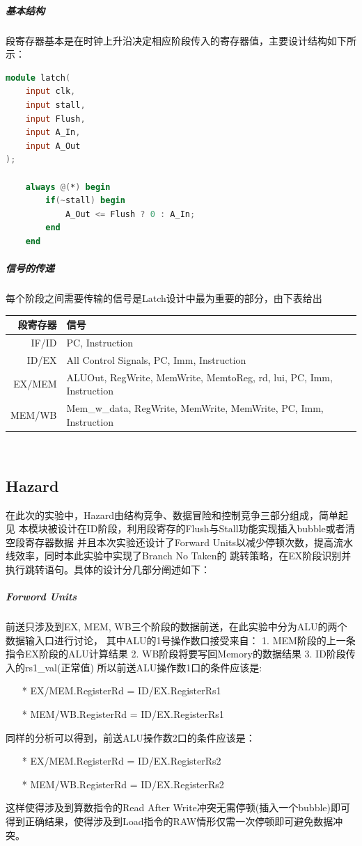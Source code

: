 \subparagraph{基本结构} 
段寄存器基本是在时钟上升沿决定相应阶段传入的寄存器值，主要设计结构如下所示：

\begin{lstlisting}[language = {verilog}]
module latch(
    input clk,
    input stall,
    input Flush,
    input A_In,
    input A_Out
);    

    always @(*) begin
        if(~stall) begin
            A_Out <= Flush ? 0 : A_In;
        end
    end
\end{lstlisting}

\subparagraph{信号的传递}
每个阶段之间需要传输的信号是Latch设计中最为重要的部分，由下表给出 \\

\begin{tabular}{|r|l|}
    \hline
    段寄存器 & 信号 \\
    \hline
    IF/ID  & PC, Instruction \\
    \hline
    ID/EX  & All Control Signals, PC, Imm, Instruction \\
    \hline
    EX/MEM & ALUOut, RegWrite, MemWrite, MemtoReg, rd, lui, PC, Imm, Instruction \\
    \hline
    MEM/WB & Mem\_w\_data, RegWrite, MemWrite, MemWrite, PC, Imm, Instruction \\
    \hline
\end{tabular} \\

\subsection{Hazard}
在此次的实验中，Hazard由结构竞争、数据冒险和控制竞争三部分组成，简单起见
本模块被设计在ID阶段，利用段寄存的Flush与Stall功能实现插入bubble或者清空段寄存器数据
并且本次实验还设计了Forward Units以减少停顿次数，提高流水线效率，同时本此实验中实现了Branch No Taken的
跳转策略，在EX阶段识别并执行跳转语句。具体的设计分几部分阐述如下：

\subparagraph{Forword Units}
前送只涉及到EX, MEM, WB三个阶段的数据前送，在此实验中分为ALU的两个数据输入口进行讨论，
其中ALU的1号操作数口接受来自：
1. MEM阶段的上一条指令EX阶段的ALU计算结果
2. WB阶段将要写回Memory的数据结果
3. ID阶段传入的rs1\_val(正常值)
所以前送ALU操作数1口的条件应该是:
\begin{itemize}
    \item [*] EX/MEM.RegisterRd = ID/EX.RegisterRs1
    \item [*] MEM/WB.RegisterRd = ID/EX.RegisterRs1
\end{itemize}
同样的分析可以得到，前送ALU操作数2口的条件应该是：
\begin{itemize}
    \item [*] EX/MEM.RegisterRd = ID/EX.RegisterRs2
    \item [*] MEM/WB.RegisterRd = ID/EX.RegisterRs2
\end{itemize}
这样使得涉及到算数指令的Read After Write冲突无需停顿(插入一个bubble)即可得到正确结果，使得涉及到Load指令的RAW情形仅需一次停顿即可避免数据冲突。

